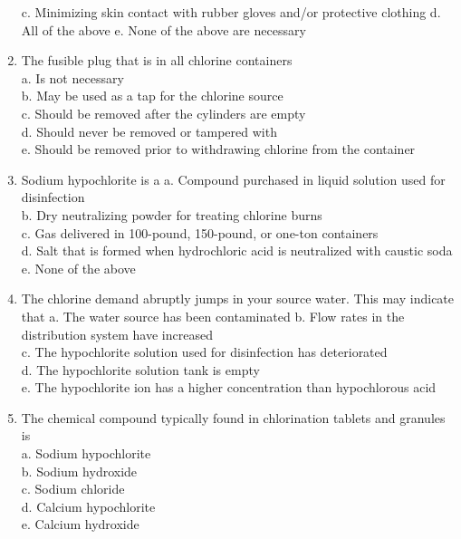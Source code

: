 \begin{enumerate}
c. Minimizing skin contact with rubber gloves and/or protective clothing
d. All of the above
e. None of the above are necessary\\
  \item The fusible plug that is in all chlorine containers\\
a. Is not necessary\\
b. May be used as a tap for the chlorine source\\
c. Should be removed after the cylinders are empty\\
d. Should never be removed or tampered with\\
e. Should be removed prior to withdrawing chlorine from the container\\
 \item Sodium hypochlorite is a
a. Compound purchased in liquid solution used for disinfection\\
b. Dry neutralizing powder for treating chlorine burns\\
c. Gas delivered in 100-pound, 150-pound, or one-ton containers\\
d. Salt that is formed when hydrochloric acid is neutralized with caustic soda\\
e. None of the above\\
  \item The chlorine demand abruptly jumps in your source water. This may indicate that a. The water source has been contaminated
b. Flow rates in the distribution system have increased\\
c. The hypochlorite solution used for disinfection has deteriorated\\
d. The hypochlorite solution tank is empty\\
e. The hypochlorite ion has a higher concentration than hypochlorous acid\\
  \item The chemical compound typically found in chlorination tablets and granules is\\
a. Sodium hypochlorite\\
b. Sodium hydroxide\\
c. Sodium chloride\\
d. Calcium hypochlorite\\
e. Calcium hydroxide\\ 


\end{enumerate}
